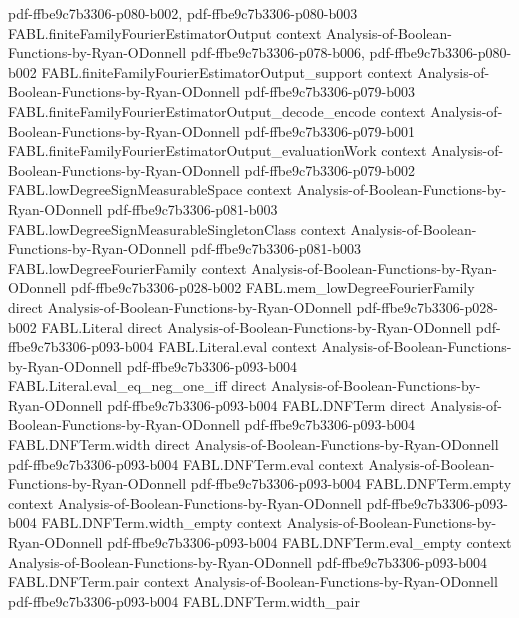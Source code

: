 \begin{theorem}
  {pdf-ffbe9c7b3306-p080-b002,
    pdf-ffbe9c7b3306-p080-b003}
\proofstep
  {FABL.finiteFamilyFourierEstimatorOutput}
  {context}
  {Analysis-of-Boolean-Functions-by-Ryan-ODonnell}
  {pdf-ffbe9c7b3306-p078-b006,
    pdf-ffbe9c7b3306-p080-b002}
\proofstep
  {FABL.finiteFamilyFourierEstimatorOutput_support}
  {context}
  {Analysis-of-Boolean-Functions-by-Ryan-ODonnell}
  {pdf-ffbe9c7b3306-p079-b003}
\proofstep
  {FABL.finiteFamilyFourierEstimatorOutput_decode_encode}
  {context}
  {Analysis-of-Boolean-Functions-by-Ryan-ODonnell}
  {pdf-ffbe9c7b3306-p079-b001}
\proofstep
  {FABL.finiteFamilyFourierEstimatorOutput_evaluationWork}
  {context}
  {Analysis-of-Boolean-Functions-by-Ryan-ODonnell}
  {pdf-ffbe9c7b3306-p079-b002}
\proofstep
  {FABL.lowDegreeSignMeasurableSpace}
  {context}
  {Analysis-of-Boolean-Functions-by-Ryan-ODonnell}
  {pdf-ffbe9c7b3306-p081-b003}
\proofstep
  {FABL.lowDegreeSignMeasurableSingletonClass}
  {context}
  {Analysis-of-Boolean-Functions-by-Ryan-ODonnell}
  {pdf-ffbe9c7b3306-p081-b003}
\proofstep
  {FABL.lowDegreeFourierFamily}
  {context}
  {Analysis-of-Boolean-Functions-by-Ryan-ODonnell}
  {pdf-ffbe9c7b3306-p028-b002}
\proofstep
  {FABL.mem_lowDegreeFourierFamily}
  {direct}
  {Analysis-of-Boolean-Functions-by-Ryan-ODonnell}
  {pdf-ffbe9c7b3306-p028-b002}
\proofstep
  {FABL.Literal}
  {direct}
  {Analysis-of-Boolean-Functions-by-Ryan-ODonnell}
  {pdf-ffbe9c7b3306-p093-b004}
\proofstep
  {FABL.Literal.eval}
  {context}
  {Analysis-of-Boolean-Functions-by-Ryan-ODonnell}
  {pdf-ffbe9c7b3306-p093-b004}
\proofstep
  {FABL.Literal.eval_eq_neg_one_iff}
  {direct}
  {Analysis-of-Boolean-Functions-by-Ryan-ODonnell}
  {pdf-ffbe9c7b3306-p093-b004}
\proofstep
  {FABL.DNFTerm}
  {direct}
  {Analysis-of-Boolean-Functions-by-Ryan-ODonnell}
  {pdf-ffbe9c7b3306-p093-b004}
\proofstep
  {FABL.DNFTerm.width}
  {direct}
  {Analysis-of-Boolean-Functions-by-Ryan-ODonnell}
  {pdf-ffbe9c7b3306-p093-b004}
\proofstep
  {FABL.DNFTerm.eval}
  {context}
  {Analysis-of-Boolean-Functions-by-Ryan-ODonnell}
  {pdf-ffbe9c7b3306-p093-b004}
\proofstep
  {FABL.DNFTerm.empty}
  {context}
  {Analysis-of-Boolean-Functions-by-Ryan-ODonnell}
  {pdf-ffbe9c7b3306-p093-b004}
\proofstep
  {FABL.DNFTerm.width_empty}
  {context}
  {Analysis-of-Boolean-Functions-by-Ryan-ODonnell}
  {pdf-ffbe9c7b3306-p093-b004}
\proofstep
  {FABL.DNFTerm.eval_empty}
  {context}
  {Analysis-of-Boolean-Functions-by-Ryan-ODonnell}
  {pdf-ffbe9c7b3306-p093-b004}
\proofstep
  {FABL.DNFTerm.pair}
  {context}
  {Analysis-of-Boolean-Functions-by-Ryan-ODonnell}
  {pdf-ffbe9c7b3306-p093-b004}
\proofstep
  {FABL.DNFTerm.width_pair}

\end{theorem}
